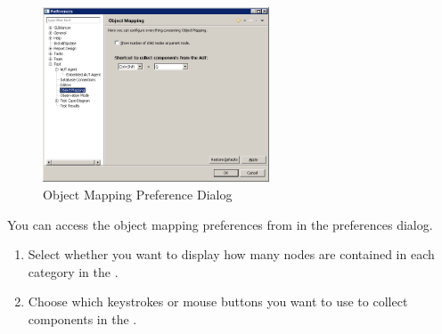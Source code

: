 

\begin{figure}[h]
\begin{center}
\includegraphics[width=0.6\textwidth]{Tasks/Preferences/PS/objectmappingprefs}
\caption{Object Mapping Preference Dialog}
\label{objectmappingprefs}
\end{center}
\end{figure}

You can access the object mapping preferences from  in the preferences dialog. 
\begin{enumerate}
\item Select whether you want \app{} to display how many nodes are contained in each category in the \gdomeditor{}. 
\item Choose which keystrokes or mouse buttons you want to use to collect components in the \gdomm{}.  
\end{enumerate}

